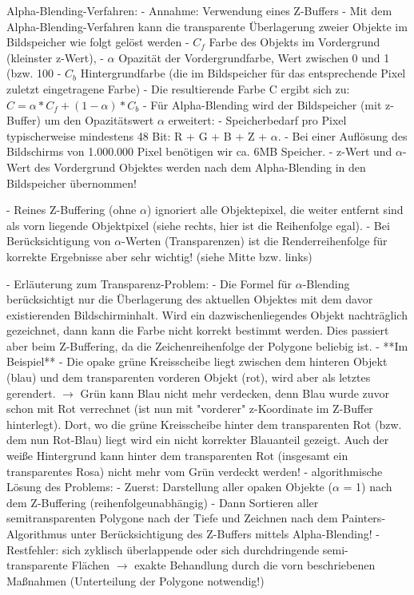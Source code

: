 \documentclass[10pt,landscape]{article}
\begin{document}
\begin{multicols}{3}
  Alpha-Blending-Verfahren: 
  - Annahme: Verwendung eines Z-Buffers 
  - Mit dem Alpha-Blending-Verfahren kann die transparente Überlagerung zweier Objekte im Bildspeicher wie folgt gelöst werden
  - $C_f$ Farbe des Objekts im Vordergrund (kleinster z-Wert),
  - $\alpha$ Opazität der Vordergrundfarbe, Wert zwischen 0 und 1 (bzw. 100%
  - $C_b$ Hintergrundfarbe (die im Bildspeicher für das entsprechende Pixel zuletzt eingetragene Farbe)
  - Die resultierende Farbe C ergibt sich zu: $C=\alpha*C_f+(1-\alpha)*C_b$
  - Für Alpha-Blending wird der Bildspeicher (mit z-Buffer) um den Opazitätswert $\alpha$ erweitert:
  - Speicherbedarf pro Pixel typischerweise mindestens 48 Bit: R + G + B + Z + $\alpha$.
  - Bei einer Auflösung des Bildschirms von 1.000.000 Pixel benötigen wir ca. 6MB Speicher.
  - z-Wert und $\alpha$-Wert des Vordergrund Objektes werden nach dem Alpha-Blending in den Bildspeicher übernommen!
  
  
  - Reines Z-Buffering (ohne $\alpha$) ignoriert alle Objektepixel, die weiter entfernt sind als vorn liegende Objektpixel (siehe rechts, hier ist die Reihenfolge egal).
  - Bei Berücksichtigung von $\alpha$-Werten (Transparenzen) ist die Renderreihenfolge für korrekte Ergebnisse aber sehr wichtig! (siehe Mitte bzw. links)
  
  - Erläuterung zum Transparenz-Problem: 
  - Die Formel für $\alpha$-Blending berücksichtigt nur die Überlagerung des aktuellen Objektes mit dem davor existierenden Bildschirminhalt. Wird ein dazwischenliegendes Objekt nachträglich gezeichnet, dann kann die Farbe nicht korrekt bestimmt werden. Dies passiert aber beim Z-Buffering, da die Zeichenreihenfolge der Polygone beliebig ist. 
  - **Im Beispiel**
  - Die opake grüne Kreisscheibe liegt zwischen dem hinteren Objekt (blau) und dem transparenten vorderen Objekt (rot), wird aber als letztes gerendert. $\rightarrow$ Grün kann Blau nicht mehr verdecken, denn Blau wurde zuvor schon mit Rot verrechnet (ist nun mit "vorderer" z-Koordinate im Z-Buffer hinterlegt). Dort, wo die grüne Kreisscheibe hinter dem transparenten Rot (bzw. dem nun Rot-Blau) liegt wird ein nicht korrekter Blauanteil gezeigt. Auch der weiße Hintergrund kann hinter dem transparenten Rot (insgesamt ein transparentes Rosa) nicht mehr vom Grün verdeckt werden!
  - algorithmische Lösung des Problems: 
  - Zuerst: Darstellung aller opaken Objekte ($\alpha$ = 1) nach dem Z-Buffering (reihenfolgeunabhängig)
  - Dann Sortieren aller semitransparenten Polygone nach der Tiefe und Zeichnen nach dem Painters-Algorithmus unter Berücksichtigung des Z-Buffers mittels Alpha-Blending!
  - Restfehler: sich zyklisch überlappende oder sich durchdringende semi-transparente Flächen $\rightarrow$ exakte Behandlung durch die vorn beschriebenen Maßnahmen (Unterteilung der Polygone notwendig!)
  

\end{multicols}
\end{document}
